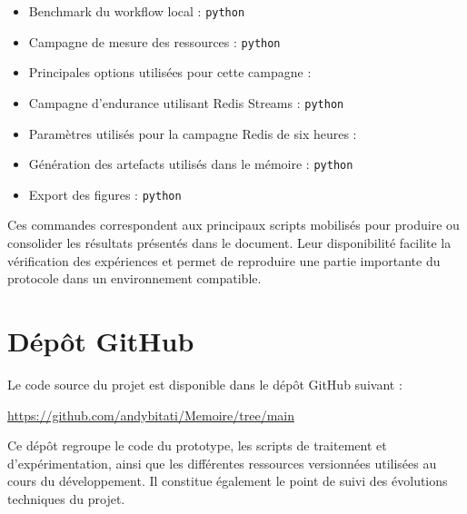 \begin{itemize}

\item Benchmark du workflow local :
\texttt{python} 

\item Campagne de mesure des ressources :
\texttt{python} 

\item Principales options utilisées pour cette campagne :

\item Campagne d'endurance utilisant Redis Streams :
\texttt{python} 

\item Paramètres utilisés pour la campagne Redis de six heures :

\item Génération des artefacts utilisés dans le mémoire :
\texttt{python} 

\item Export des figures :
\texttt{python} 

\end{itemize}

Ces commandes correspondent aux principaux scripts mobilisés pour produire ou consolider les résultats présentés dans le document. Leur disponibilité facilite la vérification des expériences et permet de reproduire une partie importante du protocole dans un environnement compatible.


\section{Dépôt GitHub}

Le code source du projet est disponible dans le dépôt GitHub suivant :

\begin{center}
\url{https://github.com/andybitati/Memoire/tree/main}
\end{center}

Ce dépôt regroupe le code du prototype, les scripts de traitement et d'expérimentation, ainsi que les différentes ressources versionnées utilisées au cours du développement. Il constitue également le point de suivi des évolutions techniques du projet.

